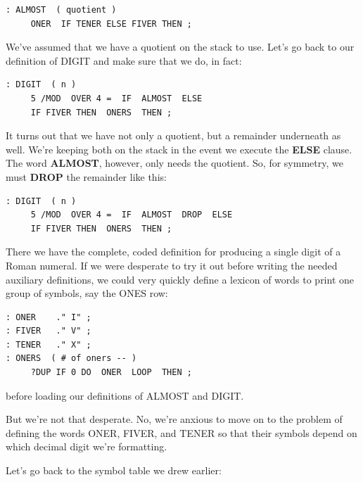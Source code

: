\begin{verbatim}
: ALMOST  ( quotient )
     ONER  IF TENER ELSE FIVER THEN ;
\end{verbatim}
We've assumed that we have a quotient on the stack to use. Let's go back
to our definition of DIGIT and make sure that we do, in fact:

\begin{verbatim}
: DIGIT  ( n )
     5 /MOD  OVER 4 =  IF  ALMOST  ELSE
     IF FIVER THEN  ONERS  THEN ;
\end{verbatim}
It turns out that we have not only a quotient, but a remainder
underneath as well. We're keeping both on the stack in the event we
execute the \textbf{ELSE} clause. The word \textbf{ALMOST}, however, only needs the
quotient. So, for symmetry, we must \textbf{DROP} the remainder like this:

\begin{verbatim}
: DIGIT  ( n )
     5 /MOD  OVER 4 =  IF  ALMOST  DROP  ELSE
     IF FIVER THEN  ONERS  THEN ;
\end{verbatim}
There we have the complete, coded definition for producing a single digit
of a Roman numeral. If we were desperate to try it out before writing the
needed auxiliary definitions, we could very quickly define a lexicon of
words to print one group of symbols, say the ONES row:

\begin{verbatim}
: ONER    ." I" ;
: FIVER   ." V" ;
: TENER   ." X" ;
: ONERS  ( # of oners -- )
     ?DUP IF 0 DO  ONER  LOOP  THEN ;
\end{verbatim}
before loading our definitions of ALMOST and DIGIT.

But we're not that desperate. No, we're anxious to move on to the
problem of defining the words ONER, FIVER, and TENER so that their
symbols depend on which decimal digit we're formatting.

Let's go back to the symbol table we drew earlier:

\bigskip

